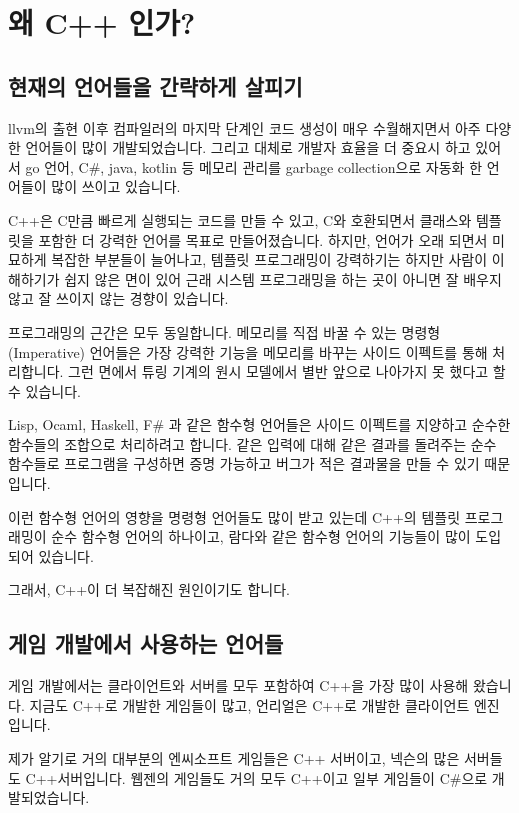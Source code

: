 \chapter{왜 C++ 인가?}

\section{현재의 언어들을 간략하게 살피기}

llvm의 출현 이후 컴파일러의 마지막 단계인 코드 생성이 매우 수월해지면서 아주 다양한 
언어들이 많이 개발되었습니다. 그리고 대체로 개발자 효율을 더 중요시 하고 있어서 
go 언어, C\#, java, kotlin 등 메모리 관리를 garbage collection으로 자동화 한 언어들이 
많이 쓰이고 있습니다. 

C++은 C만큼 빠르게 실행되는 코드를 만들 수 있고, C와 호환되면서 클래스와 템플릿을 
포함한 더 강력한 언어를 목표로 만들어졌습니다. 하지만, 언어가 오래 되면서 미묘하게 
복잡한 부분들이 늘어나고, 템플릿 프로그래밍이 강력하기는 하지만 사람이 이해하기가 
쉽지 않은 면이 있어 근래 시스템 프로그래밍을 하는 곳이 아니면 잘 배우지 않고 잘 
쓰이지 않는 경향이 있습니다. 

프로그래밍의 근간은 모두 동일합니다. 메모리를 직접 바꿀 수 있는 명령형(Imperative) 언어들은
가장 강력한 기능을 메모리를 바꾸는 사이드 이펙트를 통해 처리합니다. 그런 면에서 튜링 기계의 원시 모델에서 
별반 앞으로 나아가지 못 했다고 할 수 있습니다. 

Lisp, Ocaml, Haskell, F\# 과 같은 함수형 언어들은 사이드 이펙트를 지양하고 순수한 
함수들의 조합으로 처리하려고 합니다. 같은 입력에 대해 같은 결과를 돌려주는 순수 함수들로 
프로그램을 구성하면 증명 가능하고 버그가 적은 결과물을 만들 수 있기 때문입니다. 

이런 함수형 언어의 영향을 명령형 언어들도 많이 받고 있는데 C++의 템플릿 프로그래밍이 순수 
함수형 언어의 하나이고, 람다와 같은 함수형 언어의 기능들이 많이 도입되어 있습니다. 

그래서, C++이 더 복잡해진 원인이기도 합니다. 

\section{게임 개발에서 사용하는 언어들}

게임 개발에서는 클라이언트와 서버를 모두 포함하여 C++을 가장 많이 사용해 왔습니다. 지금도 
C++로 개발한 게임들이 많고, 언리얼은 C++로 개발한 클라이언트 엔진입니다. 

제가 알기로 거의 대부분의 엔씨소프트 게임들은 C++ 서버이고, 넥슨의 많은 서버들도 C++서버입니다. 
웹젠의 게임들도 거의 모두 C++이고 일부 게임들이 C\#으로 개발되었습니다. 

